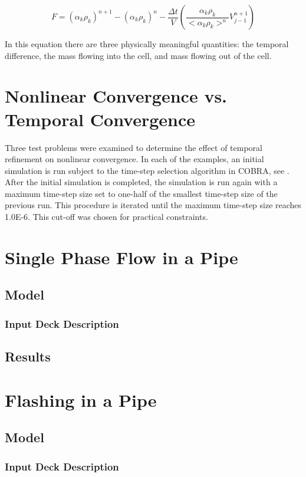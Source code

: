 \begin{equation}
F = \left(\alpha_k \rho_k\right)^{n+1} - \left( \alpha_k \rho_k \right)^n - \frac{\Delta t}{V} \left( \frac{\alpha_k \rho_k }{<\alpha_k \rho_k>^n} V^{n+1}_{j-1} \right)
\end{equation}

In this equation there are three physically meaningful quantities: the temporal difference, the mass flowing into the cell, and mass flowing out of the cell.

\section{Nonlinear Convergence vs. Temporal Convergence}
\label{sect:nonlinear_temporal_convergence}

Three test problems were examined to determine the effect of temporal refinement on nonlinear convergence.
In each of the examples, an initial simulation is run subject to the time-step selection algorithm in COBRA, see .
After the initial simulation is completed, the simulation is run again with a maximum time-step size set to one-half of the smallest time-step size of the previous run.
This procedure is iterated until the maximum time-step size reaches 1.0E-6.
This cut-off was chosen for practical constraints.

\section{Single Phase Flow in a Pipe}
\subsection{Model}
\subsubsection{Input Deck Description}
\subsection{Results}

\section{Flashing in a Pipe}
\subsection{Model}
\subsubsection{Input Deck Description}
